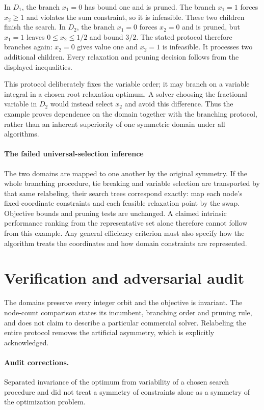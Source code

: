 \documentclass[11pt]{article}
\begin{document}
In $D_1$, the branch $x_1=0$ has bound one and is pruned. The branch $x_1=1$ forces $x_2\geq1$ and violates the sum constraint, so it is infeasible. These two children finish the search. In $D_2$, the branch $x_1=0$ forces $x_2=0$ and is pruned, but $x_1=1$ leaves $0\leq x_2\leq1/2$ and bound $3/2$. The stated protocol therefore branches again: $x_2=0$ gives value one and $x_2=1$ is infeasible. It processes two additional children. Every relaxation and pruning decision follows from the displayed inequalities.

This protocol deliberately fixes the variable order; it may branch on a variable integral in a chosen root relaxation optimum. A solver choosing the fractional variable in $D_2$ would instead select $x_2$ and avoid this difference. Thus the example proves dependence on the domain together with the branching protocol, rather than an inherent superiority of one symmetric domain under all algorithms.

\paragraph{The failed universal-selection inference}
The two domains are mapped to one another by the original symmetry. If the whole branching procedure, tie breaking and variable selection are transported by that same relabeling, their search trees correspond exactly: map each node's fixed-coordinate constraints and each feasible relaxation point by the swap. Objective bounds and pruning tests are unchanged. A claimed intrinsic performance ranking from the representative set alone therefore cannot follow from this example. Any general efficiency criterion must also specify how the algorithm treats the coordinates and how domain constraints are represented.

\section{Verification and adversarial audit}
The domains preserve every integer orbit and the objective is invariant. The node-count comparison states its incumbent, branching order and pruning rule, and does not claim to describe a particular commercial solver. Relabeling the entire protocol removes the artificial asymmetry, which is explicitly acknowledged.
\paragraph{Audit corrections.} Separated invariance of the optimum from variability of a chosen search procedure and did not treat a symmetry of constraints alone as a symmetry of the optimization problem.
\end{document}
